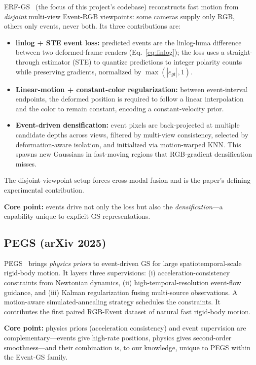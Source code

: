 ERF-GS~\cite{bai2026erfgs} (the focus of this project's codebase) reconstructs fast motion from \emph{disjoint} multi-view Event-RGB viewpoints: some cameras supply only RGB, others only events, never both. Its three contributions are:
\begin{itemize}
    \item \textbf{linlog + STE event loss:} predicted events are the linlog-luma difference between two deformed-frame renders (Eq.~\eqref{eq:linlog}); the loss uses a straight-through estimator (STE) to quantize predictions to integer polarity counts while preserving gradients, normalized by $\max(|e_{gt}|,1)$.
    \item \textbf{Linear-motion + constant-color regularization:} between event-interval endpoints, the deformed position is required to follow a linear interpolation and the color to remain constant, encoding a constant-velocity prior.
    \item \textbf{Event-driven densification:} event pixels are back-projected at multiple candidate depths across views, filtered by multi-view consistency, selected by deformation-aware isolation, and initialized via motion-warped KNN. This spawns new Gaussians in fast-moving regions that RGB-gradient densification misses.
\end{itemize}
The disjoint-viewpoint setup forces cross-modal fusion and is the paper's defining experimental contribution.

\textbf{Core point:} events drive not only the loss but also the \emph{densification}---a capability unique to explicit GS representations.

\subsection{PEGS (arXiv 2025)}
\label{sec:dynamic:pegs}

PEGS~\cite{xu2025pegs} brings \emph{physics priors} to event-driven GS for large spatiotemporal-scale rigid-body motion. It layers three supervisions: (i) acceleration-consistency constraints from Newtonian dynamics, (ii) high-temporal-resolution event-flow guidance, and (iii) Kalman regularization fusing multi-source observations. A motion-aware simulated-annealing strategy schedules the constraints. It contributes the first paired RGB-Event dataset of natural fast rigid-body motion.

\textbf{Core point:} physics priors (acceleration consistency) and event supervision are complementary---events give high-rate positions, physics gives second-order smoothness---and their combination is, to our knowledge, unique to PEGS within the Event-GS family.

